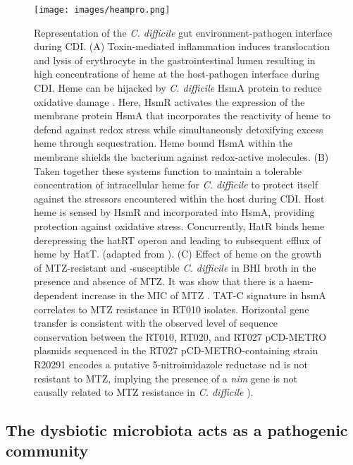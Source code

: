 \documentclass{article}
\begin{document}
\begin{figure}
\centering
\texttt{[image: images/heampro.png]}
\caption{\label{fig:heampro} Representation of the {\it C. difficile} gut environment-pathogen interface during CDI. (A) Toxin-mediated inflammation induces translocation and lysis
of erythrocyte in the gastrointestinal lumen resulting in high concentrations of heme at the host-pathogen interface during CDI. Heme can be hijacked by {\it C. difficile} HsmA protein to reduce oxidative damage \cite{Knippel}. Here, HsmR activates the expression of the membrane protein HsmA that incorporates the reactivity of heme to defend against redox stress while simultaneously detoxifying excess heme through sequestration. Heme bound HsmA within the membrane shields the bacterium against redox-active molecules. (B) Taken  together these systems function to maintain a tolerable concentration of intracellular heme for {\it C. difficile} to protect itself against the stressors encountered within the host during CDI. Host heme is sensed by HsmR and incorporated into HsmA, providing protection against oxidative stress. Concurrently, HatR binds heme derepressing the hatRT operon and leading to subsequent efflux of heme by HatT. (adapted from \cite{Knippel}). (C) Effect of heme on the growth of MTZ-resistant and -susceptible {\it C. difficile} in BHI broth in the presence and absence of MTZ. It was show that there is a haem-dependent increase in the MIC of MTZ \cite{Wu}. TAT-C signature in hsmA correlates to MTZ resistance in RT010 isolates. Horizontal gene transfer is consistent with the observed level of sequence conservation between the RT010, RT020, and RT027 pCD-METRO plasmids sequenced in \cite{Wu} the RT027 pCD-METRO-containing strain R20291 encodes a putative 5-nitroimidazole reductase nd is not resistant to MTZ, implying the presence of a {\it nim} gene is not causally related to MTZ resistance in {\it C. difficile} \cite{Boekhoud2}).}
\end{figure}

\subsection{The dysbiotic microbiota acts as a pathogenic community}
\end{document}
